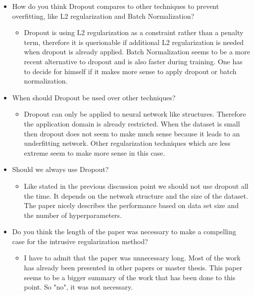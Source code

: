 \documentclass[a4paper]{article}
\begin{document}
\begin{itemize}
	\item How do you think Dropout compares to other techniques to prevent overfitting, like L2 regularization and Batch Normalization?
		\begin{itemize}
			\item Dropout is using L2 regularization as a constraint rather than a penalty term, therefore it is querionable if additional L2 regularization is needed when dropout is already applied. Batch Normalization seems to be a more recent alternative to dropout and is also faster during training. One has to decide for himself if it makes more sense to apply dropout or batch normalization.
		\end{itemize}

		
	
	\item When should Dropout be used over other techniques?
		\begin{itemize}
			\item Dropout can only be applied to neural network like structures. Therefore the application domain is already restricted. When the dataset is small then dropout does not seem to make much sense because it leads to an underfitting network. Other regularization techniques which are less extreme seem to make more sense in this case.	
		\end{itemize}	
	
	\item Should we always use Dropout?
		\begin{itemize}
			\item Like stated in the previous discussion point we should not use dropout all the time. It depends on the network structure and the size of the dataset. The paper nicely describes the performance based on data set size and the number of hyperparameters.
		\end{itemize}
		
	
	
	\item Do you think the length of the paper was necessary to make a compelling case for the intrusive regularization method?
		\begin{itemize}
			\item I have to admit that the paper was unnecessary long. Most of the work has already been presented in other papers or master thesis. This paper seems to be a bigger summary of the work that has been done to this point. So "no", it was not necessary.
		\end{itemize}
	

\end{itemize}
\end{document}
